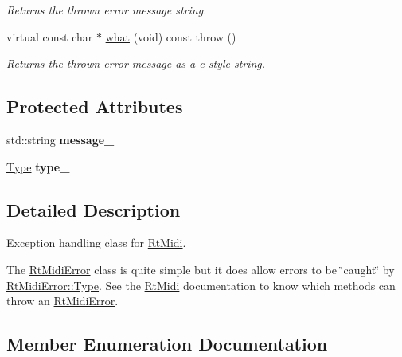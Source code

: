 \begin{DoxyCompactItemize}
\begin{DoxyCompactList}\small\item\em Returns the thrown error message string. \end{DoxyCompactList}\item 
virtual const char $\ast$ \hyperlink{class_rt_midi_error_a2ea4e8eb6ac38b123adb2a74aab90d1b}{what} (void) const   throw ()\hypertarget{class_rt_midi_error_a2ea4e8eb6ac38b123adb2a74aab90d1b}{}\label{class_rt_midi_error_a2ea4e8eb6ac38b123adb2a74aab90d1b}

\begin{DoxyCompactList}\small\item\em Returns the thrown error message as a c-\/style string. \end{DoxyCompactList}\end{DoxyCompactItemize}
\subsection*{Protected Attributes}
\begin{DoxyCompactItemize}
\item 
std\+::string {\bfseries message\+\_\+}\hypertarget{class_rt_midi_error_ad89ea4d95b72fe663836dd5b33e60857}{}\label{class_rt_midi_error_ad89ea4d95b72fe663836dd5b33e60857}

\item 
\hyperlink{class_rt_midi_error_a741314057cec5fb8c743c12f284905ee}{Type} {\bfseries type\+\_\+}\hypertarget{class_rt_midi_error_ad6f67600238af5e9378467e6b20f79dd}{}\label{class_rt_midi_error_ad6f67600238af5e9378467e6b20f79dd}

\end{DoxyCompactItemize}


\subsection{Detailed Description}
Exception handling class for \hyperlink{class_rt_midi}{Rt\+Midi}. 

The \hyperlink{class_rt_midi_error}{Rt\+Midi\+Error} class is quite simple but it does allow errors to be \char`\"{}caught\char`\"{} by \hyperlink{class_rt_midi_error_a741314057cec5fb8c743c12f284905ee}{Rt\+Midi\+Error\+::\+Type}. See the \hyperlink{class_rt_midi}{Rt\+Midi} documentation to know which methods can throw an \hyperlink{class_rt_midi_error}{Rt\+Midi\+Error}. 

\subsection{Member Enumeration Documentation}
